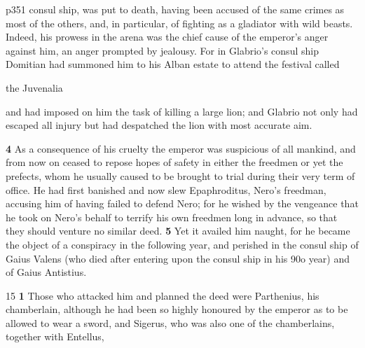 p351 consul ­ship, was put to death, having been accused of the same crimes as most of the others, and, in particular, of fighting as a gladiator with wild beasts. Indeed, his prowess in the arena was the chief cause of the emperor's anger against him, an anger prompted by jealousy. For in Glabrio's consul ­ship Domitian had summoned him to his Alban estate to attend the festival called

the Juvenalia

and had imposed on him the task of killing a large lion; and Glabrio not only had escaped all injury but had despatched the lion with most accurate aim.

\textbf{4} As a consequence of his cruelty the emperor was suspicious of all mankind, and from now on ceased to repose hopes of safety in either the freedmen or yet the prefects, whom he usually caused to be brought to trial during their very term of office. He had first banished and now slew Epaphroditus, Nero's freedman, accusing him of having failed to defend Nero; for he wished by the vengeance that he took on Nero's behalf to terrify his own freedmen long in advance, so that they should venture no similar deed. \textbf{5} Yet it availed him naught, for he became the object of a conspiracy in the following year, and perished in the consul ­ship of Gaius Valens (who died after entering upon the consul ­ship in his 90o year) and of Gaius Antistius.

15
\textbf{1} Those who attacked him and planned the deed were Parthenius, his chamberlain, although he had been so highly honoured by the emperor as to be allowed to wear a sword, and Sigerus, who was also one of the chamberlains, together with Entellus,


